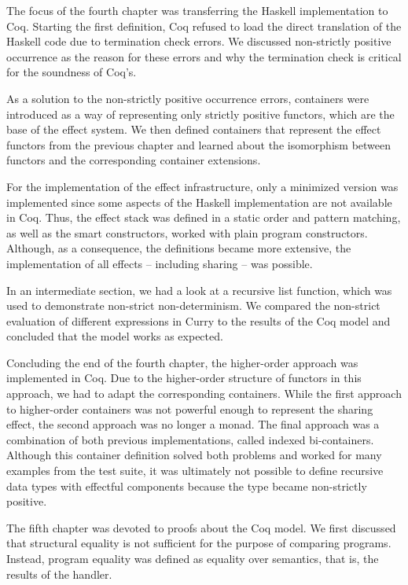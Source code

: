 \documentclass[a4paper, 11pt, fleqn, twoside]{scrreprt}
\begin{document}
The focus of the fourth chapter was transferring the Haskell implementation to Coq.
Starting the first definition, Coq refused to load the direct translation of the Haskell code due to termination check errors.
We discussed non-strictly positive occurrence as the reason for these errors and why the termination check is critical for the soundness of Coq's.

As a solution to the non-strictly positive occurrence errors, containers were introduced as a way of representing only strictly positive functors, which are the base of the effect system.
We then defined containers that represent the effect functors from the previous chapter and learned about the isomorphism between functors and the corresponding container extensions.

For the implementation of the effect infrastructure, only a minimized version was implemented since some aspects of the Haskell implementation are not available in Coq.
Thus, the effect stack was defined in a static order and pattern matching, as well as the smart constructors, worked with plain program constructors.
Although, as a consequence, the definitions became more extensive, the implementation of all effects -- including sharing -- was possible.

In an intermediate section, we had a look at a recursive list function, which was used to demonstrate non-strict non-determinism.
We compared the non-strict evaluation of different expressions in Curry to the results of the Coq model and concluded that the model works as expected.

Concluding the end of the fourth chapter, the higher-order approach was implemented in Coq.
Due to the higher-order structure of functors in this approach, we had to adapt the corresponding containers.
While the first approach to higher-order containers was not powerful enough to represent the sharing effect, the second approach was no longer a monad.
The final approach was a combination of both previous implementations, called indexed bi-containers.
Although this container definition solved both problems and worked for many examples from the test suite, it was ultimately not possible to define recursive data types with effectful components because the type became non-strictly positive.

The fifth chapter was devoted to proofs about the Coq model.
We first discussed that structural equality is not sufficient for the purpose of comparing programs.
Instead, program equality was defined as equality over semantics, that is, the results of the handler.
\end{document}
